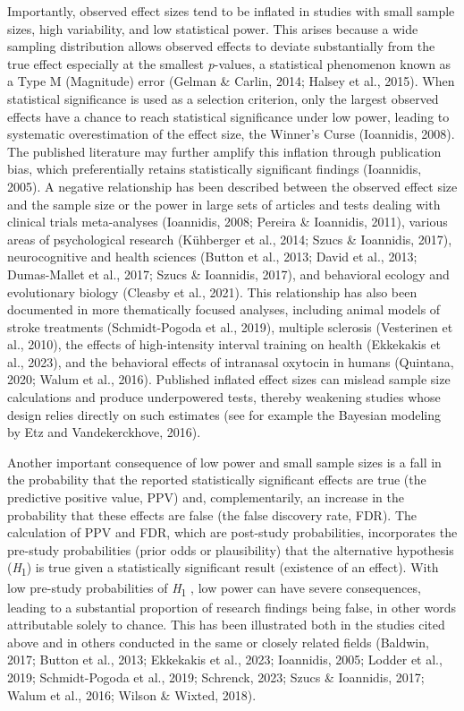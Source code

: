 \documentclass[authordate, meta]{jote-new-article}
\begin{document}
	Importantly, observed effect sizes tend to be inflated in studies with small sample sizes, high variability, and low statistical power. This arises because a wide sampling distribution allows observed effects to deviate substantially from the true effect especially at the smallest \emph{p}-values, a statistical phenomenon known as a Type M (Magnitude) error (Gelman \& Carlin, 2014; Halsey et al., 2015). When statistical significance is used as a selection criterion, only the largest observed effects have a chance to reach statistical significance under low power, leading to systematic overestimation of the effect size, the Winner's Curse (Ioannidis, 2008). The published literature may further amplify this inflation through publication bias, which preferentially retains statistically significant findings (Ioannidis, 2005). A negative relationship has been described between the observed effect size and the sample size or the power in large sets of articles and tests dealing with clinical trials meta-analyses (Ioannidis, 2008; Pereira \& Ioannidis, 2011), various areas of psychological research (Kühberger et al., 2014; Szucs \& Ioannidis, 2017), neurocognitive and health sciences (Button et al., 2013; David et al., 2013; Dumas-Mallet et al., 2017; Szucs \& Ioannidis, 2017), and behavioral ecology and evolutionary biology (Cleasby et al., 2021). This relationship has also been documented in more thematically focused analyses, including animal models of stroke treatments (Schmidt-Pogoda et al., 2019), multiple sclerosis (Vesterinen et al., 2010), the effects of high-intensity interval training on health (Ekkekakis et al., 2023), and the behavioral effects of intranasal oxytocin in humans (Quintana, 2020; Walum et al., 2016). Published inflated effect sizes can mislead sample size calculations and produce underpowered tests, thereby weakening studies whose design relies directly on such estimates (see for example the Bayesian modeling by Etz and Vandekerckhove, 2016).



	Another important consequence of low power and small sample sizes is a fall in the probability that the reported statistically significant effects are true (the predictive positive value, PPV) and, complementarily, an increase in the probability that these effects are false (the false discovery rate, FDR). The calculation of PPV and FDR, which are post-study probabilities, incorporates the pre-study probabilities (prior odds or plausibility) that the alternative hypothesis (\emph{H}\textsubscript{1}) is true given a statistically significant result (existence of an effect). With low pre-study probabilities of \emph{H}\textsubscript{1} , low power can have severe consequences, leading to a substantial proportion of research findings being false, in other words attributable solely to chance. This has been illustrated both in the studies cited above and in others conducted in the same or closely related fields (Baldwin, 2017; Button et al., 2013; Ekkekakis et al., 2023; Ioannidis, 2005; Lodder et al., 2019; Schmidt-Pogoda et al., 2019; Schrenck, 2023; Szucs \& Ioannidis, 2017; Walum et al., 2016; Wilson \& Wixted, 2018).
\end{document}
